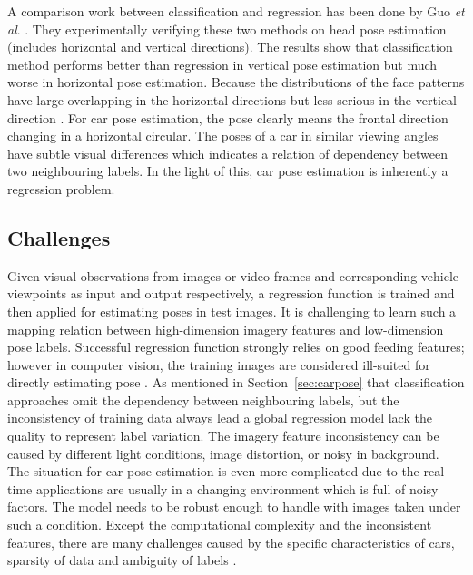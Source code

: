 \documentclass{tutmscthesis}[2010/09/22]
\numberwithin{equation}{section}
\numberwithin{table}{section}
\numberwithin{figure}{section}
\def\onedot{. }
\def\etal{\emph{et al}\onedot}
\begin{document}
\clearpage

A comparison work between classification and regression has been done by Guo \etal \cite{guo08icpr}.
They experimentally verifying these two methods on head pose estimation (includes horizontal and vertical directions). 
The results show that classification method performs better than regression in vertical pose estimation but much worse in horizontal pose estimation. 
Because the distributions of the face patterns have large overlapping in the horizontal directions but less serious in the vertical direction \cite{guo08icpr}. 
For car pose estimation, the pose clearly means the frontal direction changing in a horizontal circular.
The poses of a car in similar viewing angles have subtle visual differences which indicates a relation of dependency between two neighbouring labels. 
In the light of this, car pose estimation is inherently a regression problem.




\subsection{Challenges}
\label{subsec:challenges}

Given visual observations from images or video frames and corresponding vehicle viewpoints as input and output respectively, a regression function is trained and then applied for estimating poses in test images.
It is challenging to learn such a mapping relation between high-dimension imagery features and low-dimension pose labels. 
Successful regression function strongly relies on good feeding features; however in computer vision, the training images are considered ill-suited for directly estimating pose \cite{foytik2013two}.
As mentioned in Section~\ref{sec:carpose} that classification approaches omit the dependency between neighbouring labels, but the inconsistency of training data always lead a global regression model lack the quality to represent label variation.
The imagery feature inconsistency can be caused by different light conditions, image distortion, or noisy in background. 
The situation for car pose estimation is even more complicated due to the real-time applications are usually in a changing environment which is full of noisy factors.
The model needs to be robust enough to handle with images taken under such a condition.
Except the computational complexity and the inconsistent features, there are many challenges caused by the specific characteristics of cars, sparsity of data and ambiguity of labels \cite{HeiChe:2015}. 
\end{document}
